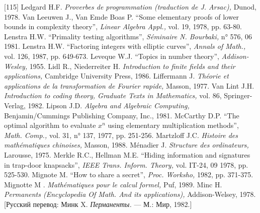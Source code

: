 \documentclass{../../template/mai_book}
\begin{document}
[115] Ledgard H.F. {\itshape Proverbes de programmation (traduction de J. Arsac),} Dunod, 1978. \newline
[116] Van Leeuwen J., Van Emde Boas P. “Some elementary proofs of
lower bounds in complexity theory”, {\itshape Linear Algebra Appl.,} vol. 19, 1978, pp. 63-80. \newline
[117] Lenstra H.W. “Primality testing algorithms”, {\itshape S\'{e}minaire N. Bourbaki,} n° 576, 06 1981. \newline
[118] Lenstra H.W. “Factoring integers with elliptic curves”, {\itshape Annals of Math.,} vol. 126, 1987, pp. 649-673. \newline
[119] Leveque W.J. “Topics in number theory”, {\itshape Addison-Wesley,} 1955. \newline
[120] Lidl R., Niederreiter H. {\itshape Introduction to finite fields and their applications,} Cambridge University Press, 1986. \newline
[121] Liffermann J. {\itshape Th\'{e}orie et applications de la transformation de Fourier rapide,} Masson, 1977. \newline
[122] Van Lint J.H. {\itshape Introduction to coding theory, Graduate Texts in Mathematics,} vol. 86, Springer-Verlag, 1982. \newline
[123] Lipson J.D. {\itshape Algebra and Algebraic Computing,} Benjamin/Cummings \newline Publishing Company, Inc., 1981. \newline
[124] McCarthy D.P. “The optimal algorithm to evaluate $x^n$ using elementary multiplication methods”, {\itshape Math. Comp.,} vol. 31, n° 137, 1977, pp. 251-256. \newline
[125] Martzloff J.C. {\itshape Histoire des math\'{e}matiques chinoises,} Masson, 1988. \newline
[126] M\'{e}nadier J. {\itshape Structure des ordinateurs,} Larousse, 1975. \newline
[127] Merkle R.C., Hellman M.E. “Hiding information and signatures in
trap-door knapsacks”, {\itshape IEEE Trans. Inform. Theory,} vol. IT-24, 09 1978, pp. 525-530. \newline
[128] Mignote M. “How to share a secret”, {\itshape Proc. Worksho,} 1982, pp. 371-375. \newline
[129] Mignotte M . {\itshape Math\'{e}matiques pour le calcul formel,} Puf, 1989. \newline
[130] Minc H. {\itshape Permanents (Encyclopedia Of Math. And its applications),} Addison-Welsey, 1978. [Русский перевод: Минк X. {\itshape Перманенты.} — М.: Мир, 1982.] \newline
\end{document}
